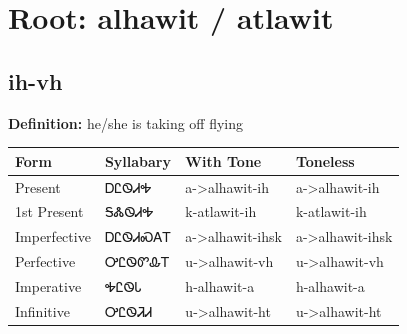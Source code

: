 \documentclass{article}%
\begin{document}
%
\normalsize%
\section*{Root: alhawit / atlawit}%
\subsection*{ih-vh}%
\textbf{Definition: }%
he/she is taking off flying%
\\[0.5em]%
\begin{tabular}{|l|l|l|l|}%
\hline%
\textbf{Form}&\textbf{Syllabary}&\textbf{With Tone}&\textbf{Toneless}\\%
\hline%
Present&ᎠᏝᏫᏗᎭ&a{-}>alhawit{-}ih&a{-}>alhawit{-}ih\\%
1st Present&ᎦᏜᏫᏗᎭ&k{-}atlawit{-}ih&k{-}atlawit{-}ih\\%
Imperfective&ᎠᏝᏫᏗᏍᎪᎢ&a{-}>alhawit{-}ihsk&a{-}>alhawit{-}ihsk\\%
Perfective&ᎤᏝᏫᏛᎲᎢ&u{-}>alhawit{-}vh&u{-}>alhawit{-}vh\\%
Imperative&ᎭᏝᏫᏓ&h{-}alhawit{-}a&h{-}alhawit{-}a\\%
Infinitive&ᎤᏝᏫᏘᏗ&u{-}>alhawit{-}ht&u{-}>alhawit{-}ht\\%
\hline%
\end{tabular}%
\\[1em]%
\end{document}
